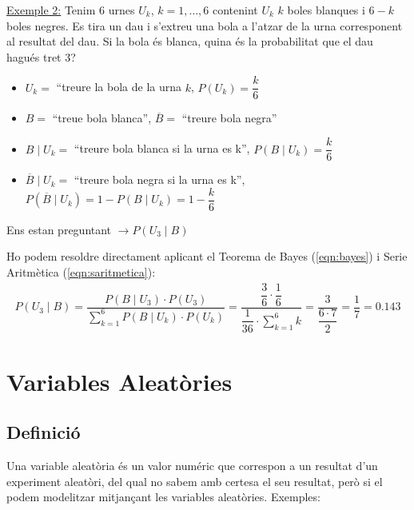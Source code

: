 \documentclass{article}
\begin{document}
\underline{Exemple 2:} Tenim 6 urnes $U_k$, $k = 1, \ldots , 6$ contenint $U_k$ $k$ boles blanques i $6-k$ boles negres.
Es tira un dau i s’extreu una bola a l’atzar de la urna corresponent al resultat del dau. Si la bola
és blanca, quina és la probabilitat que el dau hagués tret 3?
\begin{itemize}
    \item $U_k=$ ``treure la bola de la urna $k$, \quad $P(U_k) = \dfrac{k}{6}$
    \item $B=$ ``treue bola blanca'', \space $\overline{B}=$ ``treure bola negra''
    \item $B\mid U_k=$ ``treure bola blanca si la urna es k'', \quad $P(B\mid U_k) = \dfrac{k}{6}$
    \item $\overline{B}\mid U_k=$ ``treure bola negra si la urna es k'', \quad $P(\overline{B}\mid U_k) = 1 - P(B\mid U_k) = 1 - \dfrac{k}{6}$
\end{itemize}

Ens estan preguntant $\rightarrow P(U_3\mid B)$

Ho podem resoldre directament aplicant el Teorema de Bayes (\ref{eqn:bayes}) i Serie Aritmètica (\ref{eqn:saritmetica}):
\begin{align*}
P(U_3\mid B) = \dfrac{P(B\mid U_3) \cdot P(U_3)}{\displaystyle\sum_{k=1}^{6} P(B\mid U_k)\cdot  P(U_k)} = \dfrac{\dfrac{3}{6} \cdot \dfrac{1}{6}}{\dfrac{1}{36} \cdot \displaystyle\sum_{k=1}^{6} k} = \dfrac{3}{\dfrac{6 \cdot 7}{2}} = \dfrac{1}{7} = 0.143
\end{align*}

\newpage
\section{Variables Aleatòries}

\subsection{Definició}

Una variable aleatòria és un valor numéric que correspon a un resultat d'un experiment aleatòri, del qual no sabem amb certesa el seu resultat, però si el podem modelitzar mitjançant les variables aleatòries. Exemples: 
\end{document}
